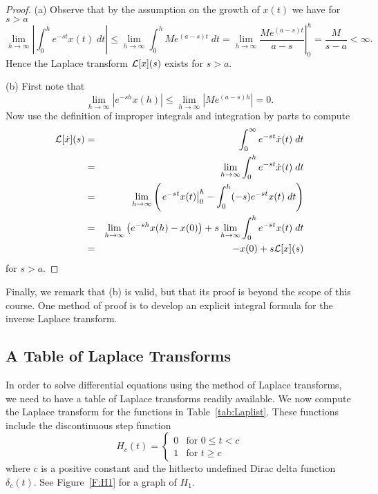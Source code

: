 \documentclass{ximera}
\begin{document}
\begin{proof} 
\noindent (a) Observe that by the assumption on the growth of 
$x(t)$ we have for $s>a$
\[
\lim\limits_{h\to \infty}\left|\int_0^h e^{-st} x(t)\; dt\right|
\le \lim\limits_{h\to \infty}\int_0^h Me^{(a-s)t}\; dt
=\lim\limits_{h\to \infty}\left.\frac{Me^{(a-s)t}}{a-s}\right|_0^h
=\frac{M}{s-a}<\infty.
\]
Hence the Laplace transform ${\cal L}[x](s)$ exists for $s>a$.

\noindent(b) First note that
\[
\lim\limits_{h\to \infty} |e^{-sh} x(h)|\le
\lim\limits_{h\to \infty} |Me^{(a-s)h}| = 0.
\]
Now use the definition of improper integrals and integration by parts to 
compute 
\begin{eqnarray*}
{\cal L}[\dot x](s) &=& \int_0^{\infty} e^{-st} \dot x(t)\; dt\\
& = & \lim\limits_{h\to \infty}\int_0^h e^{-st} \dot x(t)\; dt\\
& = & \lim\limits_{h\to \infty}\left(\left.e^{-st}x(t)\right|_0^h -
\int_0^h (-s)e^{-st} x(t)\; dt\right)\\
&=& \lim\limits_{h\to \infty} \left( e^{-sh} x(h) - x(0)\right) +
s\lim\limits_{h\to \infty} \int_0^h e^{-st} x(t)\; dt\\
&=& -x(0) + s{\cal L}[x](s)
\end{eqnarray*}
for $s>a$.  \end{proof}

Finally, we remark that (b) is valid, but that its proof is 
beyond the scope of this course.  One method of proof is to develop an 
explicit integral formula for the inverse Laplace transform. 


\subsection*{A Table of Laplace Transforms}

In order to solve differential equations using the method of Laplace 
transforms, we need to have a table of Laplace transforms readily available.  
We now compute the Laplace transform for the functions in 
Table~\ref{tab:Laplist}.   These functions include the discontinuous step 
function 
\[
H_c(t) = \left\{\begin{array}{ll}
0 & \mbox{for $0\le t < c$}\\
1 & \mbox{for $t\ge c$}
\end{array}\right. 
\]
where $c$ is a positive constant and the hitherto undefined Dirac delta 
function $\delta_c(t)$.  See Figure~\ref{F:H1} for a graph of $H_1$.
\end{document}
